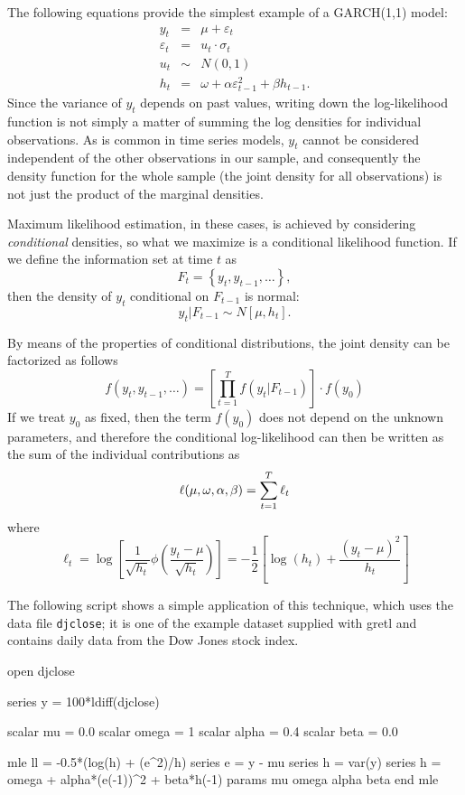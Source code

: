 The following equations provide the simplest example of a GARCH(1,1)
model:
\begin{eqnarray*}
  y_t & = & \mu + \varepsilon_t \\
  \varepsilon_t & = & u_t \cdot \sigma_t \\
  u_t & \sim & N(0,1) \\
  h_t & = & \omega + \alpha \varepsilon^2_{t-1} + \beta h_{t-1}.
\end{eqnarray*}
Since the variance of $y_t$ depends on past values, writing down the
log-likelihood function is not simply a matter of summing the log
densities for individual observations. As is common in time series
models, $y_t$ cannot be considered independent of the other
observations in our sample, and consequently the density function for
the whole sample (the joint density for all observations) is not just
the product of the marginal densities.

Maximum likelihood estimation, in these cases, is achieved by
considering \emph{conditional} densities, so what we maximize is a
conditional likelihood function. If we define the information set at
time $t$ as
\[
  F_t = \left\{ y_t, y_{t-1}, \ldots \right\} ,
\]
then the density of $y_t$ conditional on $F_{t-1}$ is normal:
\[
  y_t | F_{t-1} \sim N\left[ \mu, h_{t} \right].
\]

By means of the properties of conditional distributions, the joint
density can be factorized as follows
\[
  f(y_t, y_{t-1}, \ldots) = \left[ \prod_{t=1}^T f(y_t |F_{t-1})
  \right] \cdot f(y_0)
\]
If we treat $y_0$ as fixed, then the term $f(y_0)$ does not depend on
the unknown parameters, and therefore the conditional log-likelihood
can then be written as the sum of the individual contributions as
\begin{equation}
  \label{eq:garchloglik}
  \ell(\mu,\omega,\alpha,\beta) = \sum_{t=1}^T \ell_t
\end{equation}
where 
\[
  \ell_t = \log \left[ \frac{1}{\sqrt{h_t}} \phi\left( \frac{y_t - \mu}{\sqrt{h_t}}
    \right) \right] = 
    - \frac{1}{2} \left[ \log(h_t) + \frac{(y_t - \mu)^2}{h_t} \right]
\]

The following script shows a simple application of this technique,
which uses the data file \texttt{djclose}; it is one of the example
dataset supplied with gretl and contains daily data from the Dow Jones
stock index.

\begin{code}
open djclose

series y = 100*ldiff(djclose)

scalar mu = 0.0
scalar omega = 1
scalar alpha = 0.4
scalar beta = 0.0

mle ll = -0.5*(log(h) + (e^2)/h)
  series e = y - mu
  series h = var(y)
  series h = omega + alpha*(e(-1))^2 + beta*h(-1)
  params mu omega alpha beta
end mle
\end{code}

